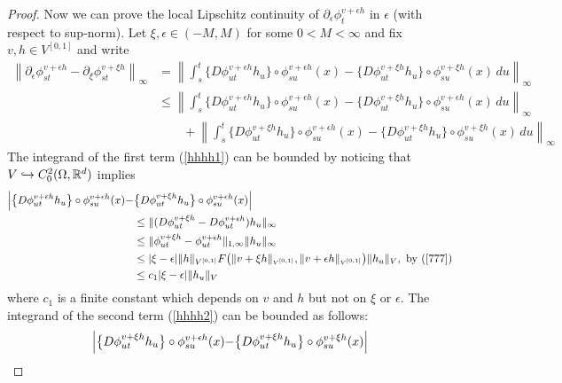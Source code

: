 \documentclass[noinfoline]{imsart}
\begin{document}
\begin{proof}
{    Now we can prove the local Lipschitz continuity of  ${\partial_\epsilon}  \phi^{ v+\epsilon h}_t  $ in $\epsilon$  (with respect to sup-norm). Let $\xi, \epsilon\in (-M, M)$ for some $0<M<\infty$ and fix $v,h\in V^{[0,1]}$ and write
\begin{align}
\left \| \partial_\epsilon  \phi^{ v+\epsilon h}_{st} -  \partial_\xi   \phi^{ v+\xi h}_{st}  \right\|_{\infty} & = \left \| \int_s^t  \bigl\{D\phi^{ v+\epsilon h}_{ut} h_u \bigr\}\circ{\phi^{v+\epsilon h}_{su}(x)}-  \bigl\{D\phi^{v+\xi h}_{ut} h_u \bigr\}\circ{\phi^{v+\xi h}_{su}(x)}\,   du    \right\|_{\infty}\nonumber \\
& \leq  \left\| \int_s^t  \bigl\{D\phi^{ v+\epsilon h}_{ut} h_u \bigr\}\circ{\phi^{ v+\epsilon h}_{su}(x)}-  \bigl\{D\phi^{ v+\xi h }_{ut} h_u \bigr\}\circ{\phi^{v+\epsilon h}_{su}(x)}\,   du    \right\|_{\infty}\label{hhhh1}  \\ 
& \qquad+ \left\| \int_s^t  \bigl\{D\phi^{v+\xi h}_{ut} h_u \bigr\}\circ{\phi^{v+\epsilon h}_{su}(x)}-  \bigl\{D\phi^{v+\xi h}_{ut} h_u \bigr\}\circ{\phi^{ v+\xi h}_{su}(x)}\,   du    \right\|_{\infty}  \label{hhhh2}
\end{align}
The integrand of the first  term (\ref{hhhh1}) can be bounded by noticing that   $V\hookrightarrow C_0^{2}(\Omega, \Bbb R^d)$ implies
\begin{align}
  \Bigl| \bigl\{D\phi^{ v+\epsilon h}_{ut} h_u \bigr\}\circ{\phi^{ v+\epsilon h}_{su}(x)}- & \bigl\{D\phi^{ v+\xi h }_{ut} h_u \bigr\}\circ{\phi^{v+\epsilon h}_{su}(x)}\Bigr| \nonumber\\
  &\leq \|  (D\phi_{ut}^{ v+\xi h} -D \phi_{ut}^{ v+\epsilon h})h_u   \|_\infty  \nonumber\\
  &\leq  \|  \phi_{ut}^{ v+\xi h} - \phi_{ut}^{v+\epsilon h}  \|_{1,\infty}  \| h_u\|_{\infty} \nonumber\\
&\leq |\xi -\epsilon| \|  h  \|_{V^{[0,1]}}  F\bigl( {\|v+\xi h\|_\text{\tiny $V^{[0,1]}$}},{\|v+\epsilon h\|_\text{\tiny $V^{[0,1]}$}}\bigr)   \| h_u\|_{V},\,\,\text{by (\ref{777})} \nonumber\\
&\leq c_1 |\xi -\epsilon|   \| h_u\|_{V}
\label{uuuu}
\end{align}
where $c_1$ is a finite constant which depends on $v$ and $h$ but not on   $\xi$ or $\epsilon$.
The integrand of the second term  (\ref{hhhh2}) can be bounded as follows:
\begin{align}
 \Bigr|\bigl\{D\phi^{v+\xi h}_{ut} h_u \bigr\}\circ{\phi^{v+\epsilon h}_{su}(x)}-  &\bigl\{D\phi^{v+\xi h}_{ut} h_u \bigr\}\circ{\phi^{ v+\xi h}_{su}(x)}\Bigl| \nonumber   \\

\end{align}}
\end{proof}
\end{document}

